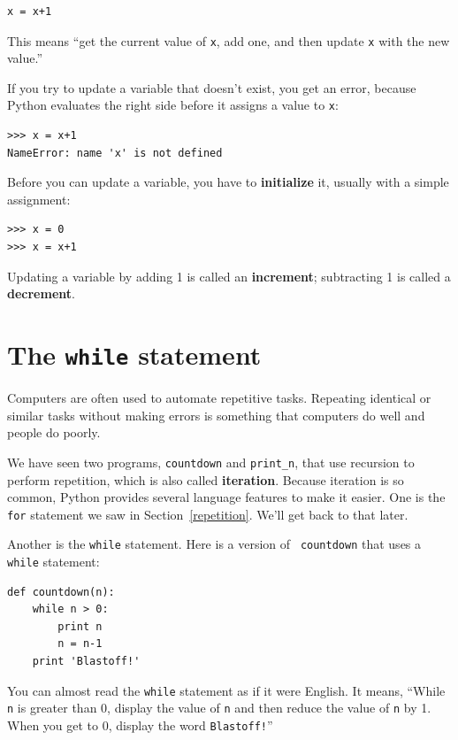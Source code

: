 \documentclass[10pt]{book}
\begin{document}
\beforeverb
\begin{verbatim}
x = x+1
\end{verbatim}
\afterverb
%
This means ``get the current value of {\tt x}, add one, and then
update {\tt x} with the new value.''

If you try to update a variable that doesn't exist, you get an
error, because Python evaluates the right side before it assigns
a value to {\tt x}:

\beforeverb
\begin{verbatim}
>>> x = x+1
NameError: name 'x' is not defined
\end{verbatim}
\afterverb
%
Before you can update a variable, you have to {\bf initialize}
it, usually with a simple assignment:


\beforeverb
\begin{verbatim}
>>> x = 0
>>> x = x+1
\end{verbatim}
\afterverb
%
Updating a variable by adding 1 is called an {\bf increment};
subtracting 1 is called a {\bf decrement}.





\section{The {\tt while} statement}


Computers are often used to automate repetitive tasks.  Repeating
identical or similar tasks without making errors is something that
computers do well and people do poorly.

We have seen two programs, {\tt countdown} and \verb"print_n", that
use recursion to perform repetition, which is also called {\bf
iteration}.  Because iteration is so common, Python provides several
language features to make it easier.  One is the {\tt for} statement
we saw in Section~\ref{repetition}.  We'll get back to that later.

Another is the {\tt while} statement.  Here is a version of {\tt
countdown} that uses a {\tt while} statement:

\beforeverb
\begin{verbatim}
def countdown(n):
    while n > 0:
        print n
        n = n-1
    print 'Blastoff!'
\end{verbatim}
\afterverb
%
You can almost read the {\tt while} statement as if it were English.
It means, ``While {\tt n} is greater than 0,
display the value of {\tt n} and then reduce the value of
{\tt n} by 1.  When you get to 0, display the word {\tt Blastoff!}''
\end{document}
